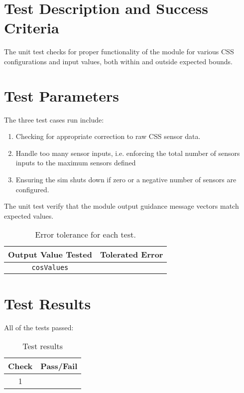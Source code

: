 
\section{Test Description and Success Criteria}
The unit test checks for proper functionality of the module for various CSS configurations and input values, both within and outside expected bounds.



\section{Test Parameters}

The three test cases run include:
\begin{enumerate}
\item Checking for appropriate correction to raw CSS sensor data.
\item Handle too many sensor inputs, i.e. enforcing the total number of sensors inputs to the maximum sensors defined
\item Ensuring the sim shuts down if zero or a negative number of sensors are configured.
\end{enumerate}

The unit test verify that the module output guidance message vectors match expected values.
\begin{table}[htbp]
	\caption{Error tolerance for each test.}
	\label{tab:errortol}
	\centering \fontsize{10}{10}\selectfont
	\begin{tabular}{ c | c } %
		\hline\hline
		\textbf{Output Value Tested}  & \textbf{Tolerated Error}  \\ 
		\hline
		{\tt cosValues}        & 	   \\ 
		\hline\hline
	\end{tabular}
\end{table}




\section{Test Results}

All of the tests passed:
\begin{table}[H]
	\caption{Test results}
	\label{tab:results}
	\centering \fontsize{10}{10}\selectfont
	\begin{tabular}{c | c  } %
		\hline\hline
		\textbf{Check} 						  		&\textbf{Pass/Fail} \\ 
		\hline
	   1	   			&  \\ 

	   \hline\hline
	\end{tabular}
\end{table}








